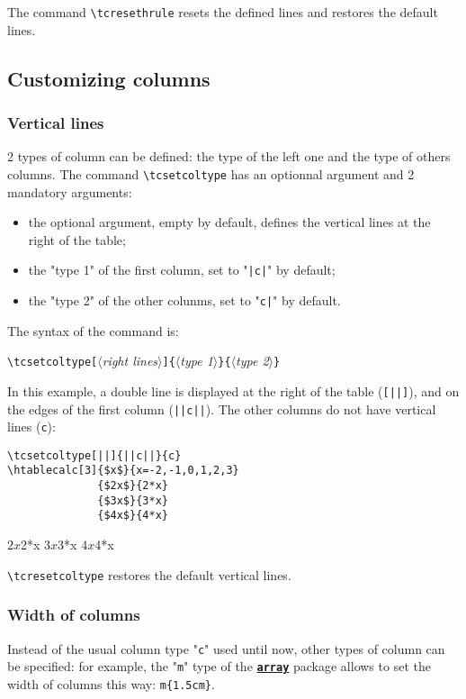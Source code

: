 \documentclass[a4paper,10pt]{article}
\newcommand\argu[1]{$\langle$\textit{#1}$\rangle$}
\newcommand\ARGU[1]{\texttt{\{}\argu{#1}\texttt{\}}}
\newcommand\arguC[1]{\texttt{[}\argu{#1}\texttt{]}}
\newcommand\verbinline{\lstinline[breaklines=false,basicstyle=\normalsize\ttfamily]}
\newcommand\mywidth{0.85\linewidth}
\begin{document}
The command \verbinline|\tcresethrule| resets the defined lines and restores the default lines.

\subsection{Customizing columns}
\subsubsection{Vertical lines}
2 types of column can be defined: the type of the left one and the type of others columns. The command \verbinline|\tcsetcoltype| has an optionnal argument and 2 mandatory arguments:
\begin{itemize}
	\item the optional argument, empty by default, defines the vertical lines at the right of the table;
	\item the "type 1" of the first column, set to "\verb-|c|-" by default;
	\item the  "type 2" of the other colunms, set to "\verb-c|-" by default.
\end{itemize}\medskip

The syntax of the command is:\par\nobreak
\verbinline|\tcsetcoltype|\arguC{right lines}\ARGU{type 1}\ARGU{type 2}\medskip

In this example, a double line is displayed at the right of the table (\verb=[||]=), and on the edges of the first column (\verb=||c||=). The other columns do not have vertical lines (\verb|c|):
\begin{center}
\begin{minipage}{\mywidth}
\begin{lstlisting}
\tcsetcoltype[||]{||c||}{c}
\htablecalc[3]{$x$}{x=-2,-1,0,1,2,3}
              {$2x$}{2*x}
              {$3x$}{3*x}
              {$4x$}{4*x}
\end{lstlisting}
\end{minipage}

              {$2x$}{2*x}
              {$3x$}{3*x}
              {$4x$}{4*x}
\end{center}

\verbinline|\tcresetcoltype| restores the default vertical lines.

\subsubsection{Width of columns}
Instead of the usual column type "\verb|c|" used until now, other types of column can be specified: for example, the "\verb|m|" type of the \href{http://www.ctan.org/tex-archive/graphics/pgf/base/latex/pgf/basiclayer/}{\texttt{\textbf{array}}} package allows to set the width of columns this way: \verb|m{1.5cm}|.\medskip
\end{document}
